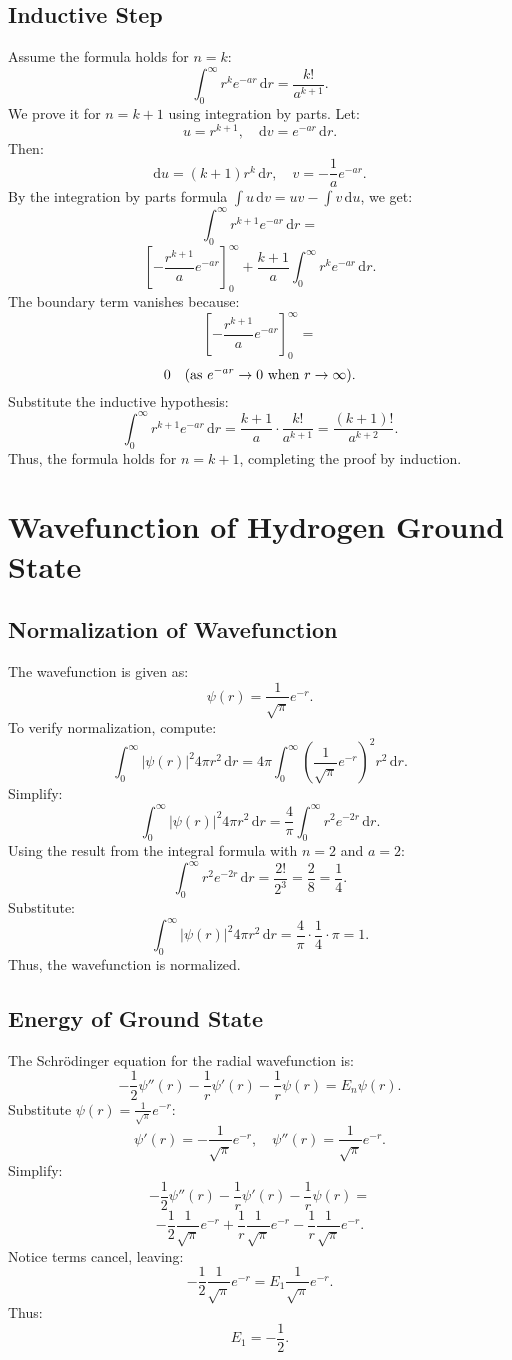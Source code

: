 \documentclass[a4paper,12pt]{article}
\begin{document}
\begin{multicols}{2}
\subsection*{Inductive Step}
Assume the formula holds for \( n = k \):
\[
\int_0^\infty r^k e^{-ar} \, \mathrm{d}r = \frac{k!}{a^{k+1}}.
\]
We prove it for \( n = k+1 \) using integration by parts. Let:
\[
u = r^{k+1}, \quad \mathrm{d}v = e^{-ar} \, \mathrm{d}r.
\]
Then:
\[
\mathrm{d}u = (k+1)r^k \, \mathrm{d}r, \quad v = -\frac{1}{a} e^{-ar}.
\]
By the integration by parts formula \( \int u \, \mathrm{d}v = uv - \int v \, \mathrm{d}u \), we get:
\[
\int_0^\infty r^{k+1} e^{-ar} \, \mathrm{d}r =
\]
\[
\left[-\frac{r^{k+1}}{a} e^{-ar} \right]_0^\infty + \frac{k+1}{a} \int_0^\infty r^k e^{-ar} \, \mathrm{d}r.
\]
The boundary term vanishes because:
\[
\left[-\frac{r^{k+1}}{a} e^{-ar} \right]_0^\infty = 
\]
\[
0 \quad \text{(as \( e^{-ar} \to 0 \) when \( r \to \infty \))}.
\]
Substitute the inductive hypothesis:
\[
\int_0^\infty r^{k+1} e^{-ar} \, \mathrm{d}r = \frac{k+1}{a} \cdot \frac{k!}{a^{k+1}} = \frac{(k+1)!}{a^{k+2}}.
\]
Thus, the formula holds for \( n = k+1 \), completing the proof by induction.

\section*{Wavefunction of Hydrogen Ground State}
\subsection*{Normalization of Wavefunction}
The wavefunction is given as:
\[
\psi(r) = \frac{1}{\sqrt{\pi}} e^{-r}.
\]
To verify normalization, compute:
\[
\int_0^\infty |\psi(r)|^2 4\pi r^2 \, \mathrm{d}r = 4\pi \int_0^\infty \left(\frac{1}{\sqrt{\pi}} e^{-r}\right)^2 r^2 \, \mathrm{d}r.
\]
Simplify:
\[
\int_0^\infty |\psi(r)|^2 4\pi r^2 \, \mathrm{d}r = \frac{4}{\pi} \int_0^\infty r^2 e^{-2r} \, \mathrm{d}r.
\]
Using the result from the integral formula with \( n=2 \) and \( a=2 \):
\[
\int_0^\infty r^2 e^{-2r} \, \mathrm{d}r = \frac{2!}{2^3} = \frac{2}{8} = \frac{1}{4}.
\]
Substitute:
\[
\int_0^\infty |\psi(r)|^2 4\pi r^2 \, \mathrm{d}r = \frac{4}{\pi} \cdot \frac{1}{4} \cdot \pi = 1.
\]
Thus, the wavefunction is normalized.

\subsection*{Energy of Ground State}
The Schrödinger equation for the radial wavefunction is:
\[
-\frac{1}{2} \psi''(r) - \frac{1}{r} \psi'(r) - \frac{1}{r} \psi(r) = E_n \psi(r).
\]
Substitute \( \psi(r) = \frac{1}{\sqrt{\pi}} e^{-r} \):
\[
\psi'(r) = -\frac{1}{\sqrt{\pi}} e^{-r}, \quad \psi''(r) = \frac{1}{\sqrt{\pi}} e^{-r}.
\]
Simplify:
\[
-\frac{1}{2} \psi''(r) - \frac{1}{r} \psi'(r) - \frac{1}{r} \psi(r) = 
\]
\[
-\frac{1}{2} \frac{1}{\sqrt{\pi}} e^{-r} + \frac{1}{r} \frac{1}{\sqrt{\pi}} e^{-r} - \frac{1}{r} \frac{1}{\sqrt{\pi}} e^{-r}.
\]
Notice terms cancel, leaving:
\[
-\frac{1}{2} \frac{1}{\sqrt{\pi}} e^{-r} = E_1 \frac{1}{\sqrt{\pi}} e^{-r}.
\]
Thus:
\[
E_1 = -\frac{1}{2}.
\]

\end{multicols}
\end{document}
